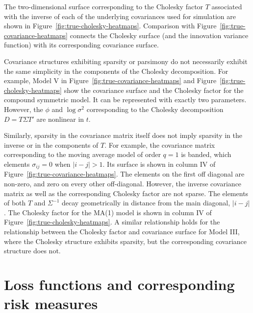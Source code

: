 \documentclass[12pt]{article}
\theoremstyle{definition}
\begin{document}
\bigskip



\bigskip

The two-dimensional surface corresponding to the Cholesky factor $T$ associated with the inverse of each of the underlying covariances used for simulation are shown in Figure~\ref{fig:true-cholesky-heatmaps}. Comparison with Figure~\ref{fig:true-covariance-heatmaps}  connects the Cholesky surface (and the innovation variance function) with its corresponding covariance surface.



Covariance structures exhibiting sparsity or parsimony do not necessarily exhibit the same simplicity in the components of the Cholesky decomposition.  For example, Model V in Figure~\ref{fig:true-covariance-heatmaps} and Figure~\ref{fig:true-cholesky-heatmaps} show the covariance surface and the Cholesky factor for the compound symmetric model. It can be represented with exactly two parameters. However, the $\phi$ and $\log \sigma^2$ corresponding to the Cholesky decomposition $D = T \Sigma T'$ are nonlinear in $t$. 

\bigskip

Similarly, sparsity in the covariance matrix itself does not imply sparsity in the inverse or in the components of $T$. For example, the covariance matrix corresponding to the moving average model of order $q=1$  is banded, which elements $\sigma_{ij} = 0$ when $\vert i-j \vert > 1$.  Its surface is shown in column IV of Figure~\ref{fig:true-covariance-heatmaps}. The elements on the first off diagonal are non-zero, and zero on every other off-diagonal. However, the inverse covariance matrix as well as the corresponding Cholesky factor are not sparse. The elements of both $T$ and $\Sigma^{-1}$ decay geometrically in distance from the main diagonal,  $\vert i-j \vert$.  The Cholesky factor for the MA(1) model is shown in column IV of  Figure~\ref{fig:true-cholesky-heatmaps}. A similar relationship holds for the relationship between the Cholesky factor and covariance surface for Model III, where the Cholesky structure exhibits sparsity, but the corresponding covariance structure does not. 

\bigskip


\bigskip

\section{Loss functions and corresponding risk measures}

\end{document}
